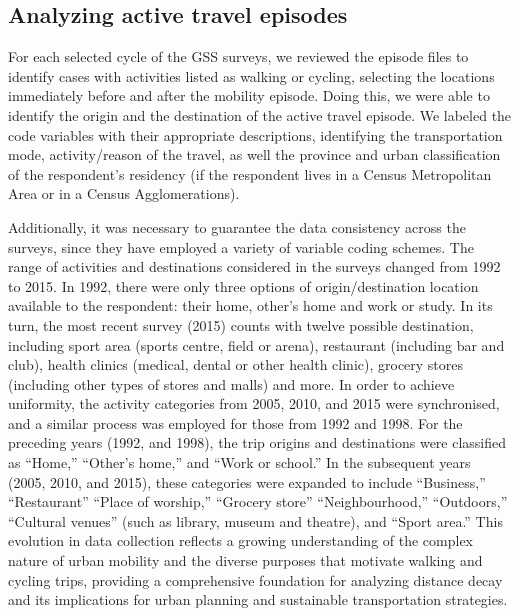 \documentclass[preprint, 3p,
authoryear]{elsarticle} %
\begin{document}
\subsection{Analyzing active travel
episodes}\label{analyzing-active-travel-episodes}

For each selected cycle of the GSS surveys, we reviewed the episode
files to identify cases with activities listed as walking or cycling,
selecting the locations immediately before and after the mobility
episode. Doing this, we were able to identify the origin and the
destination of the active travel episode. We labeled the code variables
with their appropriate descriptions, identifying the transportation
mode, activity/reason of the travel, as well the province and urban
classification of the respondent's residency (if the respondent lives in
a Census Metropolitan Area or in a Census Agglomerations).

Additionally, it was necessary to guarantee the data consistency across
the surveys, since they have employed a variety of variable coding
schemes. The range of activities and destinations considered in the
surveys changed from 1992 to 2015. In 1992, there were only three
options of origin/destination location available to the respondent:
their home, other's home and work or study. In its turn, the most recent
survey (2015) counts with twelve possible destination, including sport
area (sports centre, field or arena), restaurant (including bar and
club), health clinics (medical, dental or other health clinic), grocery
stores (including other types of stores and malls) and more. In order to
achieve uniformity, the activity categories from 2005, 2010, and 2015
were synchronised, and a similar process was employed for those from
1992 and 1998. For the preceding years (1992, and 1998), the trip
origins and destinations were classified as ``Home,'' ``Other's home,''
and ``Work or school.'' In the subsequent years (2005, 2010, and 2015),
these categories were expanded to include ``Business,'' ``Restaurant''
``Place of worship,'' ``Grocery store'' ``Neighbourhood,'' ``Outdoors,''
``Cultural venues'' (such as library, museum and theatre), and ``Sport
area.'' This evolution in data collection reflects a growing
understanding of the complex nature of urban mobility and the diverse
purposes that motivate walking and cycling trips, providing a
comprehensive foundation for analyzing distance decay and its
implications for urban planning and sustainable transportation
strategies.
\end{document}

